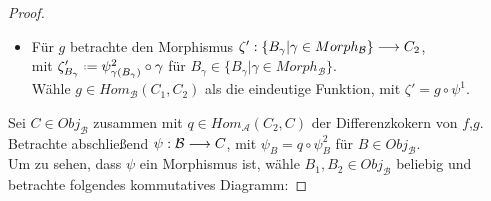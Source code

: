 \documentclass[10pt,a4paper]{report}
\newcommand{\functionfront}[3]{\nolinebreak{#1:#2 \longrightarrow #3}}
\newcommand*{\defeq}{\mathrel{\vcenter{\baselineskip0.5ex \lineskiplimit0pt
                     \hbox{\scriptsize.}\hbox{\scriptsize.}}}%
                     =}
\begin{document}
\begin{proof}
{\begin{itemize}
mit $\zeta_{B_{\gamma}} \defeq \psi^2_{\gamma(B_{\gamma})}$ für $B_{\gamma} \in \lbrace B_{\gamma} \vert \gamma \in Morph_{\mathcal{B}}\rbrace$.\\
Wähle $f \in Hom_{\mathcal{B}}(C_1,C_2)$ als die eindeutige Funktion, mit $\zeta = f \circ \psi^1$.
\item[]
Für $g$ betrachte den Morphismus $\functionfront{\zeta'}{\lbrace B_{\gamma} \vert \gamma \in Morph_{\mathcal{B}}\rbrace}{C_2}$,\\
mit $\zeta'_{B_{\gamma}} \defeq \psi^2_{\gamma(B_{\gamma})} \circ \gamma$ für $B_{\gamma} \in \lbrace B_{\gamma} \vert \gamma \in Morph_{\mathcal{B}}\rbrace$.\\
Wähle $g \in Hom_{\mathcal{B}}(C_1,C_2)$ als die eindeutige Funktion, mit $\zeta' = g \circ \psi^1$.
\end{itemize}
\begin{center}
\end{center}
Sei $C \in Obj_{\mathcal{B}}$ zusammen mit $q \in Hom_{\mathcal{A}}(C_2,C)$ der Differenzkokern von $f$,$g$.\\
Betrachte abschließend $\functionfront{\psi}{\mathcal{B}}{C}$, mit $\psi_{B} = q \circ \psi^2_B$ für $B \in Obj_{\mathcal{B}}$.\\
Um zu sehen, dass $\psi$ ein Morphismus ist, wähle $B_1,B_2 \in Obj_{\mathcal{B}}$ beliebig und betrachte folgendes kommutatives Diagramm:
}
\end{proof}
\end{document}
